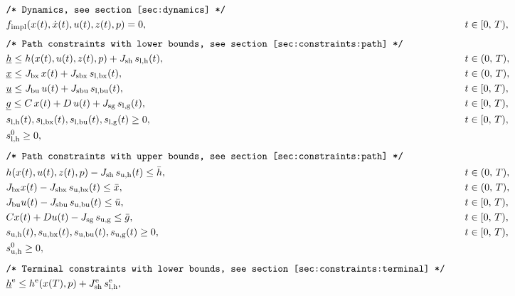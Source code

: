 \documentclass[english]{article}
\newcommand{\ind}[1]{_{\textrm{#1}}}
\newcommand{\terminal}{^{\textrm{e}}}
\newcommand{\initial}{^{\textrm{0}}}
\newcommand{\lowerh}{\ind{l,h}}
\newcommand{\lowerbx}{\ind{l,bx}}
\newcommand{\lowerbu}{\ind{l,bu}}
\newcommand{\lowerg}{\ind{l,g}}
\newcommand{\upperh}{\ind{u,h}}
\newcommand{\upperbx}{\ind{u,bx}}
\newcommand{\upperbu}{\ind{u,bu}}
\newcommand{\upperg}{\ind{u,g}}
\newcommand{\mathComment}[1]{\texttt{/* #1 */}}
\begin{document}
\begin{align}
    &&&\mathComment{Dynamics, see section \ref{sec:dynamics}}\nonumber\\
    &&& f\ind{impl}(x(t), \dot{x}(t), u(t), z(t), p) = 0, &&\quad t \in [0,\,T), \label{eq:dynamics}\\[1ex]
    &&&\mathComment{Path constraints with lower bounds, see section \ref{sec:constraints:path}}\nonumber\\
    &&&\underline{h} \leq h(x(t), u(t), z(t), p) + J_{\textrm{sh}} \, s\lowerh(t), &&\quad t \in (0,\,T),\\
    &&&\underline{x} \leq J_{\textrm{bx}} \, x(t) + J_{\textrm{sbx}} \,s\lowerbx(t), &&\quad t \in (0,\,T),\\
    &&&\underline{u} \leq J_{\textrm{bu}} \,u(t) + J_{\textrm{sbu}} \,s\lowerbu(t), &&\quad t \in [0,\,T),\\
    &&&\underline{g} \leq C\,x(t) + D\,u(t) + J_{\textrm{sg}} \,s\lowerg(t), &&\quad t \in [0,\,T), \\
    &&& s\lowerh (t), s\lowerbx(t), s\lowerbu(t), s\lowerg(t) \geq 0, &&\quad t \in [0,\,T), \\
    &&& s\lowerh\initial \geq 0, && \label{eq:constraints:path:lower_bounds:end}\\[1ex]
    &&&\mathComment{Path constraints with upper bounds, see section \ref{sec:constraints:path}}\nonumber\\
    &&& h(x(t), u(t), z(t), p) - J_{\textrm{sh}} \, s\upperh(t) \leq \bar{h}, &&\quad t \in (0,\,T),\\
    &&& J_{\textrm{bx}} x(t) - J_{\textrm{sbx}}\, s\upperbx(t) \leq \bar{x}, &&\quad t \in (0,\,T),\\
    &&& J_{\textrm{bu}} u(t) - J_{\textrm{sbu}}\, s\upperbu(t)\leq \bar{u}, &&\quad t \in [0,\,T),\\
    &&& Cx(t) + Du(t) - J_{\textrm{sg}}\, s\upperg \leq \bar{g}, &&\quad t \in [0,\,T), \\
    &&& s\upperh(t), s\upperbx(t), s\upperbu(t), s\upperg(t) \geq 0, &&\quad t \in [0,\,T), \\
    &&& s\ind{u,h}\initial \geq 0, && \label{eq:constraints:path:upper_bounds:end}\\[1ex]
    &&&\mathComment{Terminal constraints with lower bounds, see section \ref{sec:constraints:terminal}}\nonumber\\
    &&&\underline{h}\terminal \leq h\terminal(x(T), p) + J\ind{sh}\terminal\, s\lowerh\terminal, &&\label{eq:constraints:terminal:lower_bounds:start}\\

\end{align}
\end{document}
